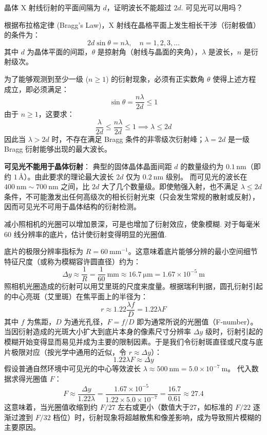 \begin{exercise}\label{ex:8.19}
晶体 X 射线衍射的平面间隔为 $d$，证明波长不能超过 $2d$. 可见光可以用吗？
\end{exercise}
\begin{solution}
根据布拉格定律 (Bragg's Law)，X 射线在晶格平面上发生相长干涉（衍射极值）的条件为：
$$ 2d \sin\theta = n\lambda, \quad n = 1, 2, 3, \ldots $$
其中 $d$ 为晶体平面的间距，$\theta$ 是掠射角（射线与晶面的夹角），$\lambda$ 是波长，$n$ 是衍射级次。

为了能够观测到至少一级 ($n \ge 1$) 的衍射现象，必须有正实数角 $\theta$ 使得上述方程成立，即必须满足：
$$ \sin\theta = \frac{n\lambda}{2d} \le 1 $$
由于 $n \ge 1$，这要求：
$$ \frac{\lambda}{2d} \le \frac{n\lambda}{2d} \le 1 \implies \lambda \le 2d $$
因此当 $\lambda>2d$ 时，不存在满足 Bragg 条件的非零级次衍射峰；$\lambda=2d$ 是一级 Bragg 衍射能够出现的最大波长。

\textbf{可见光不能用于晶体衍射}：
典型的固体晶体晶面间距 $d$ 的数量级约为 $0.1\,\mathrm{nm}$（即约 $1\,\text{\AA}$）。由此要求的理论最大波长 $2d$ 仅为 $0.2 \ \mathrm{nm}$ 级别。
而可见光的波长在 $400 \ \mathrm{nm} \sim 700 \ \mathrm{nm}$ 之间，比 $2d$ 大了几个数量级。即使勉强入射，也不满足 $\lambda \le 2d$ 条件，不可能激发出任何高级次的相长衍射光束（只会发生常规的散射或反射），因而可见光不可用于晶体结构的衍射检测。
\end{solution}

\begin{exercise}\label{ex:8.20}
减小照相机的光圈可以增加景深，可是也增加了衍射效应，使象模糊. 对于每毫米 $60$ 线分辨率的底片，估计使衍射变得明显的光圈值.
\end{exercise}
\begin{solution}
底片的极限分辨率指标为 $R = 60 \ \mathrm{mm^{-1}}$。这意味着底片能够分辨的最小空间细节特征尺度（或称为模糊容许圆直径）约为：
$$ \Delta y \approx \frac{1}{R} = \frac{1}{60} \ \mathrm{mm} \approx 16.7 \ \mathrm{\mu m} = 1.67 \times 10^{-5} \ \mathrm{m} $$
照相机光圈造成的衍射可以用艾里斑的尺度来度量。根据瑞利判据，圆孔衍射引起的中心亮斑（艾里斑）在焦平面上的半径为：
$$ r \approx 1.22 \frac{\lambda f}{D} = 1.22 \lambda F $$
其中 $f$ 为焦距，$D$ 为通光孔径，$F = f/D$ 即为通常所说的光圈值（F-number）。
当因衍射造成的光斑大小扩大到底片本身的像素尺寸分辨率 $\Delta y$ 级时，衍射引起的模糊开始变得显而易见并成为主要的限制因素。于是我们令衍射斑直径或尺度与底片极限对应（按光学中通用的近似，令 $r \approx \Delta y$）：
$$ 1.22 \lambda F \approx \Delta y $$
假设普通自然环境中可见光的中心等效波长 $\lambda \approx 500 \ \mathrm{nm} = 5.0 \times 10^{-7} \ \mathrm{m}$。
代入数据求得光圈值 $F$：
$$ F \approx \frac{\Delta y}{1.22 \lambda} = \frac{1.67 \times 10^{-5}}{1.22 \times 5.0 \times 10^{-7}} = \frac{16.7}{0.61} \approx 27.4 $$
这意味着，当光圈值收缩到约 $F/27$ 左右或更小（数值大于27，如标准的 $F/22$ 逐渐过渡到 $F/32$ 档位）时，衍射现象将超越散焦和像差影响，成为导致照片模糊的主要原因。
\end{solution}

